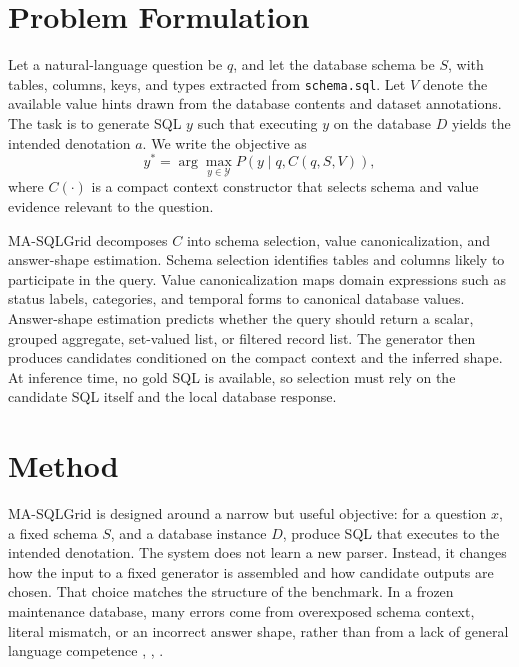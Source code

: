 \documentclass{ieeeaccess}
\begin{document}
\section{Problem Formulation}\label{problem-formulation}

Let a natural-language question be \(q\), and let the database schema be \(S\), with tables, columns, keys, and types extracted from \texttt{schema.sql}. Let \(V\) denote the available value hints drawn from the database contents and dataset annotations. The task is to generate SQL \(y\) such that executing \(y\) on the database \(D\) yields the intended denotation \(a\). We write the objective as \[
y^* = \arg\max_{y \in \mathcal{Y}} P(y \mid q, C(q,S,V)),
\] where \(C(\cdot)\) is a compact context constructor that selects schema and value evidence relevant to the question.

MA-SQLGrid decomposes \(C\) into schema selection, value canonicalization, and answer-shape estimation. Schema selection identifies tables and columns likely to participate in the query. Value canonicalization maps domain expressions such as status labels, categories, and temporal forms to canonical database values. Answer-shape estimation predicts whether the query should return a scalar, grouped aggregate, set-valued list, or filtered record list. The generator then produces candidates conditioned on the compact context and the inferred shape. At inference time, no gold SQL is available, so selection must rely on the candidate SQL itself and the local database response.

\section{Method}\label{method}

MA-SQLGrid is designed around a narrow but useful objective: for a question \(x\), a fixed schema \(S\), and a database instance \(D\), produce SQL that executes to the intended denotation. The system does not learn a new parser. Instead, it changes how the input to a fixed generator is assembled and how candidate outputs are chosen. That choice matches the structure of the benchmark. In a frozen maintenance database, many errors come from overexposed schema context, literal mismatch, or an incorrect answer shape, rather than from a lack of general language competence \cite{wu2022chains}, \cite{talaei2024chess}, \cite{pourreza2023dinsql}.
\end{document}
